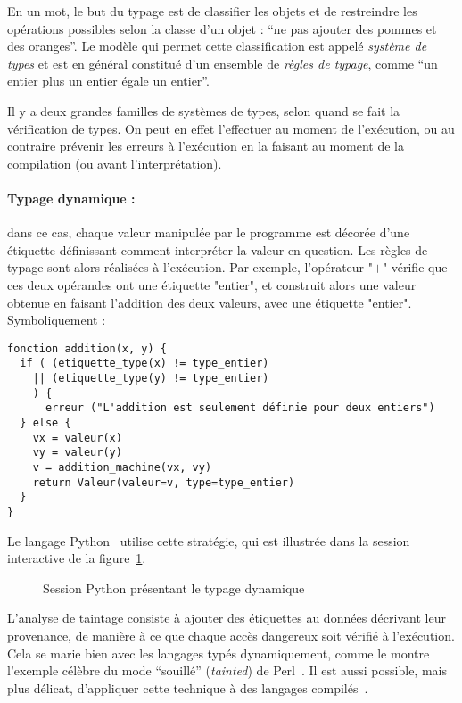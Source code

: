 En un mot, le but du typage est de classifier les objets et de restreindre les
opérations possibles selon la classe d'un objet : ``ne pas ajouter des pommes et
des oranges''. Le modèle qui permet cette classification est appelé
\emph{système de types} et est en général constitué d'un ensemble de
\emph{règles de typage}, comme ``un entier plus un entier égale un entier''.

Il y a deux grandes familles de systèmes de types, selon quand se fait la
vérification de types. On peut en effet l'effectuer au moment de l'exécution, ou
au contraire prévenir les erreurs à l'exécution en la faisant au moment de la
compilation (ou avant l'interprétation).

\paragraph{Typage dynamique :} dans ce cas, chaque valeur manipulée par le
programme est décorée d'une étiquette définissant comment interpréter la valeur
en question. Les règles de typage sont alors réalisées à l'exécution. Par
exemple, l'opérateur "$+$" vérifie que ces deux opérandes ont une étiquette
"entier", et construit alors une valeur obtenue en faisant l'addition des deux
valeurs, avec une étiquette "entier". Symboliquement :

\begin{verbatim}
fonction addition(x, y) {
  if ( (etiquette_type(x) != type_entier)
    || (etiquette_type(y) != type_entier)
    ) {
      erreur ("L'addition est seulement définie pour deux entiers")
  } else {
    vx = valeur(x)
    vy = valeur(y)
    v = addition_machine(vx, vy)
    return Valeur(valeur=v, type=type_entier)
  }
}
\end{verbatim}

Le langage Python~ utilise cette stratégie, qui est illustrée dans
la session interactive de la figure~\ref{fig:typage-dynamique}.

\begin{figure}
  \caption{Session Python présentant le typage dynamique}
  \label{fig:typage-dynamique}
\end{figure}

L'analyse de taintage consiste à ajouter des étiquettes au données décrivant
leur provenance, de manière à ce que chaque accès dangereux soit vérifié à
l'exécution. Cela se marie bien avec les langages typés dynamiquement, comme le
montre l'exemple célèbre du mode ``souillé'' (\emph{tainted}) de
Perl~\cite{perlCamelBook}. Il est aussi possible, mais plus délicat, d'appliquer
cette technique à des langages compilés~\cite{clause-etal-issta07,oakland10}.

